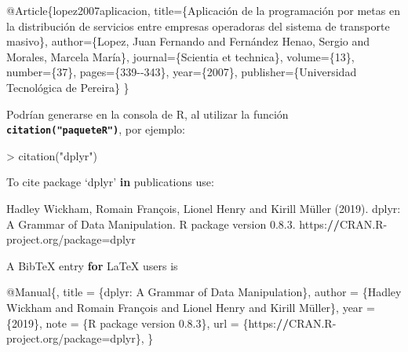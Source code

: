 \documentclass[12pt,a4paper,oneside,]{book}
\newenvironment{Shaded}{\begin{snugshade}}{\end{snugshade}}
\newcommand{\ControlFlowTok}[1]{\textcolor[rgb]{0.13,0.29,0.53}{\textbf{#1}}}
\newcommand{\DataTypeTok}[1]{\textcolor[rgb]{0.13,0.29,0.53}{#1}}
\newcommand{\DecValTok}[1]{\textcolor[rgb]{0.00,0.00,0.81}{#1}}
\newcommand{\ErrorTok}[1]{\textcolor[rgb]{0.64,0.00,0.00}{\textbf{#1}}}
\newcommand{\FloatTok}[1]{\textcolor[rgb]{0.00,0.00,0.81}{#1}}
\newcommand{\FunctionTok}[1]{\textcolor[rgb]{0.00,0.00,0.00}{#1}}
\newcommand{\NormalTok}[1]{#1}
\newcommand{\OtherTok}[1]{\textcolor[rgb]{0.56,0.35,0.01}{#1}}
\newcommand{\SpecialCharTok}[1]{\textcolor[rgb]{0.00,0.00,0.00}{#1}}
\newcommand{\StringTok}[1]{\textcolor[rgb]{0.31,0.60,0.02}{#1}}
\newcommand{\VariableTok}[1]{\textcolor[rgb]{0.00,0.00,0.00}{#1}}
\numberwithin{dummy}{section}
\theoremstyle{ocrenumbox}
\theoremstyle{blacknumex}
\theoremstyle{blacknumbox}
\theoremstyle{ocrenum}
\theoremstyle{ocrenum}
\begin{document}
\begin{Shaded}
\begin{Highlighting}[]
\VariableTok{@Article}\NormalTok{\{}\OtherTok{lopez2007aplicacion}\NormalTok{,}
  \DataTypeTok{title}\NormalTok{=\{Aplicación de la programación por metas en la distribución de }
\NormalTok{  servicios entre empresas operadoras del sistema de transporte masivo\},}
  \DataTypeTok{author}\NormalTok{=\{Lopez, Juan Fernando and Fernández Henao, Sergio and Morales,}
\NormalTok{  Marcela María\},}
  \DataTypeTok{journal}\NormalTok{=\{Scientia et technica\},}
  \DataTypeTok{volume}\NormalTok{=\{13\},}
  \DataTypeTok{number}\NormalTok{=\{37\},}
  \DataTypeTok{pages}\NormalTok{=\{339{-}{-}343\},}
  \DataTypeTok{year}\NormalTok{=\{2007\},}
  \DataTypeTok{publisher}\NormalTok{=\{Universidad Tecnológica de Pereira\}}
\NormalTok{\}}

\end{Highlighting}
\end{Shaded}

Podrían generarse en la consola de R, al utilizar la función
\textbf{\texttt{citation("paqueteR")}}, por ejemplo:

\footnotesize

\begin{Shaded}
\begin{Highlighting}[]
\SpecialCharTok{\textgreater{}} \FunctionTok{citation}\NormalTok{(}\StringTok{"dplyr"}\NormalTok{)}

\NormalTok{To cite package ‘dplyr’ }\ControlFlowTok{in}\NormalTok{ publications use}\SpecialCharTok{:}

\NormalTok{  Hadley Wickham, Romain François, Lionel Henry and Kirill Müller (}\DecValTok{2019}\NormalTok{). dplyr}\SpecialCharTok{:}\NormalTok{ A}
\NormalTok{  Grammar of Data Manipulation. R package version }\DecValTok{0}\NormalTok{.}\DecValTok{8}\NormalTok{.}\FloatTok{3.}
\NormalTok{  https}\SpecialCharTok{:}\ErrorTok{//}\NormalTok{CRAN.R}\SpecialCharTok{{-}}\NormalTok{project.org}\SpecialCharTok{/}\NormalTok{package}\OtherTok{=}\NormalTok{dplyr}

\NormalTok{A BibTeX entry }\ControlFlowTok{for}\NormalTok{ LaTeX users is}

  \SpecialCharTok{@}\NormalTok{Manual\{,}
\NormalTok{    title }\OtherTok{=}\NormalTok{ \{dplyr}\SpecialCharTok{:}\NormalTok{ A Grammar of Data Manipulation\},}
\NormalTok{    author }\OtherTok{=}\NormalTok{ \{Hadley Wickham and Romain François and Lionel Henry and Kirill Müller\},}
\NormalTok{    year }\OtherTok{=}\NormalTok{ \{}\DecValTok{2019}\NormalTok{\},}
\NormalTok{    note }\OtherTok{=}\NormalTok{ \{R package version }\DecValTok{0}\NormalTok{.}\FloatTok{8.3}\NormalTok{\},}
\NormalTok{    url }\OtherTok{=}\NormalTok{ \{https}\SpecialCharTok{:}\ErrorTok{//}\NormalTok{CRAN.R}\SpecialCharTok{{-}}\NormalTok{project.org}\SpecialCharTok{/}\NormalTok{package}\OtherTok{=}\NormalTok{dplyr\},}
\NormalTok{  \}}
\end{Highlighting}
\end{Shaded}
\end{document}
